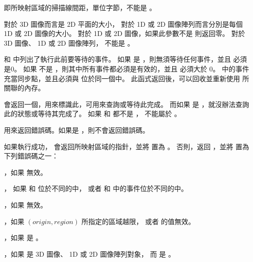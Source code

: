  即所映射區域的掃描線間距，單位字節，不能是 。

 對於 3D 圖像而言是 2D 平面的大小，
對於 1D 或 2D 圖像陣列而言分別是每個 1D 或 2D 圖像的大小。
對於 1D 或 2D 圖像，如果此參數不是  則返回零。
對於 3D 圖像、 1D 或 2D 圖像陣列，  不能是 。

 和  中列出了執行此前要等待的事件。
如果  是 ，則無須等待任何事件，並且  必須是0。
如果  不是 ，則其中所有事件都必須是有效的，並且  必須大於 0。
 中的事件充當同步點，並且必須與  位於同一個中。
此函式返回後，可以回收並重新使用  所關聯的內存。

 會返回一個，用來標識此，可用來查詢或等待此完成。
而如果  是 ，就沒辦法查詢此的狀態或等待其完成了。
如果  和  都不是 ，  不能屬於 。

 用來返回錯誤碼。如果是 ，則不會返回錯誤碼。

如果執行成功，  會返回所映射區域的指針，並將  置為 。
否則，返回 ，並將  置為下列錯誤碼之一：
\startigBase
\item {}，如果  無效。

\item {}，
  如果  和  位於不同的中，
  或者  和  中的事件位於不同的中。

\item {}，如果  無效。

\item {}，如果 $(origin, region)$ 所指定的區域越限，
  或者  的值無效。

\item {}，如果  是 。

\item {}，如果  是 3D 圖像、 1D 或 2D 圖像陣列對象，
  而  是 。

